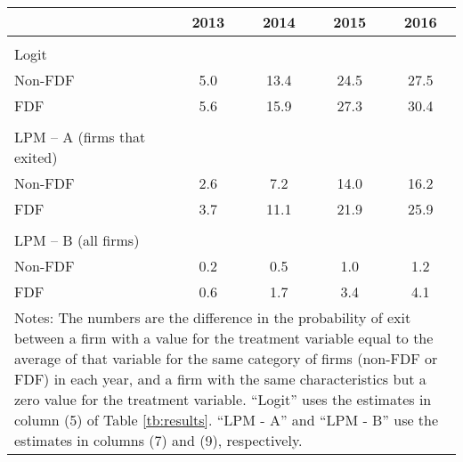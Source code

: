 \begin{tabular}{lcccc}
\hline & 2013 & 2014 & 2015 & 2016 \\ \hline \\
Logit &  &  &  &  \\ 
\hspace*{0.2cm}Non-FDF & 5.0 & 13.4 & 24.5 & 27.5 \\ 
\hspace*{0.2cm}FDF & 5.6 & 15.9 & 27.3 & 30.4 \\ 
 &  &  &  &  \\ 
LPM – A (firms that exited) &  &  &  &  \\ 
\hspace*{0.2cm}Non-FDF & 2.6 & 7.2 & 14.0 & 16.2 \\ 
\hspace*{0.2cm}FDF & 3.7 & 11.1 & 21.9 & 25.9 \\ 
 &  &  &  &  \\ 
LPM – B (all firms) &  &  &  &  \\ 
\hspace*{0.2cm}Non-FDF & 0.2 & 0.5 & 1.0 & 1.2 \\ 
\hspace*{0.2cm}FDF & 0.6 & 1.7 & 3.4 & 4.1 \\ 
\hline
\multicolumn{5}{p{0.65\textwidth}}{\footnotesize Notes: The numbers are the difference in the probability of exit between a firm with a value for the treatment variable equal to the average of that variable for the same category of firms (non-FDF or FDF) in each year, and a firm with the same characteristics but a zero value for the treatment variable. ``Logit'' uses the estimates in column (5) of Table \ref{tb:results}. ``LPM - A'' and ``LPM - B'' use the estimates in columns (7) and (9), respectively.} 
\end{tabular}
